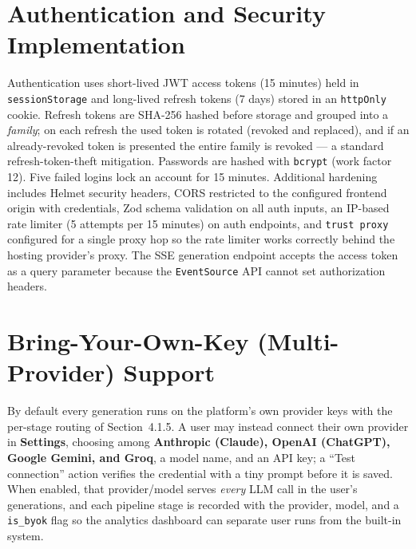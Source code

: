 \documentclass[12pt,a4paper,oneside]{report}
\begin{document}
\section{Authentication and Security Implementation}
Authentication uses short-lived JWT access tokens (15 minutes) held in \texttt{sessionStorage} and long-lived refresh tokens (7 days) stored in an \texttt{httpOnly} cookie. Refresh tokens are SHA-256 hashed before storage and grouped into a \emph{family}; on each refresh the used token is rotated (revoked and replaced), and if an already-revoked token is presented the entire family is revoked --- a standard refresh-token-theft mitigation. Passwords are hashed with \texttt{bcrypt} (work factor 12). Five failed logins lock an account for 15 minutes. Additional hardening includes Helmet security headers, CORS restricted to the configured frontend origin with credentials, Zod schema validation on all auth inputs, an IP-based rate limiter (5 attempts per 15 minutes) on auth endpoints, and \texttt{trust proxy} configured for a single proxy hop so the rate limiter works correctly behind the hosting provider's proxy. The SSE generation endpoint accepts the access token as a query parameter because the \texttt{EventSource} API cannot set authorization headers.

\section{Bring-Your-Own-Key (Multi-Provider) Support}
By default every generation runs on the platform's own provider keys with the per-stage routing of Section~4.1.5. A user may instead connect their own provider in \textbf{Settings}, choosing among \textbf{Anthropic (Claude), OpenAI (ChatGPT), Google Gemini, and Groq}, a model name, and an API key; a ``Test connection'' action verifies the credential with a tiny prompt before it is saved. When enabled, that provider/model serves \emph{every} LLM call in the user's generations, and each pipeline stage is recorded with the provider, model, and a \texttt{is\_byok} flag so the analytics dashboard can separate user runs from the built-in system.
\end{document}
